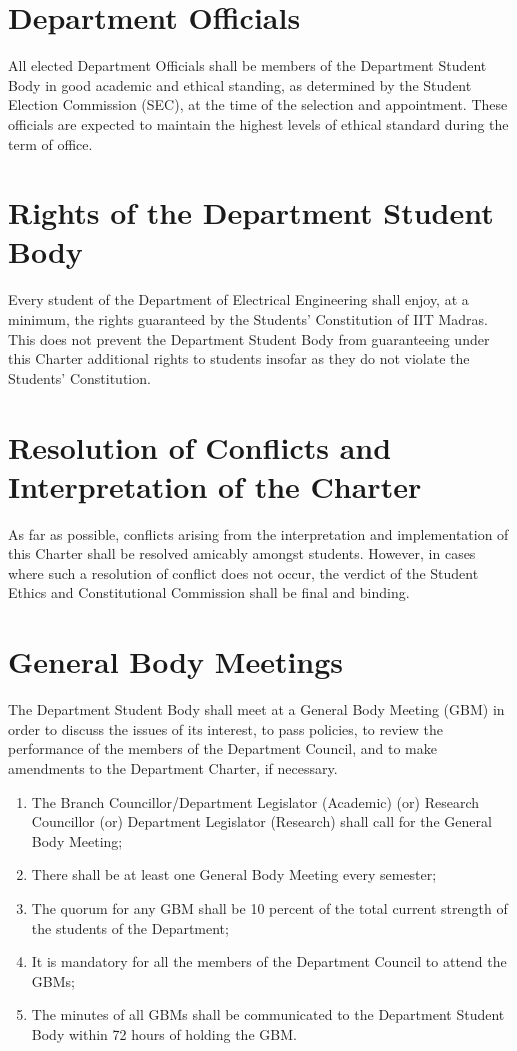 \documentclass[12pt]{charter}
\begin{document}
\section{Department Officials}
All elected Department Officials shall be members of the Department Student Body in good academic and ethical standing, as determined by the Student Election Commission (SEC), at the time of the selection and appointment. These officials are expected to maintain the highest levels of ethical standard during the term of office.

\section{Rights of the Department Student Body}
Every student of the Department of Electrical Engineering shall enjoy, at a minimum, the rights guaranteed by the Students’ Constitution of IIT Madras. This does not prevent the Department Student Body from guaranteeing under this Charter additional rights to students insofar as they do not violate the Students’ Constitution.

\section{Resolution of Conflicts and Interpretation of the Charter}
As far as possible, conflicts arising from the interpretation and implementation of this Charter shall be resolved amicably amongst students. However, in cases where such a resolution of conflict does not occur, the verdict of the Student Ethics and Constitutional Commission shall be final and binding.

\pagebreak


\section{General Body Meetings}
The Department Student Body shall meet at a General Body Meeting (GBM) in order to discuss the issues of its interest, to pass policies, to review the performance of the members of the Department Council, and to make amendments to the Department Charter, if necessary.

\renewcommand{\labelenumi}{\Alph{enumi}}
\begin{enumerate}
	\item The Branch Councillor/Department Legislator (Academic) (or) Research Councillor (or) Department Legislator (Research) shall call for the General Body Meeting;
	\item There shall be at least one General Body Meeting every semester;
	\item The quorum for any GBM shall be 10 percent of the total current strength of the students of the Department;
	\item It is mandatory for all the members of the Department Council to attend the GBMs;
	\item The minutes of all GBMs shall be communicated to the Department Student Body within 72 hours of holding the GBM.
\end{enumerate}
\end{document}
